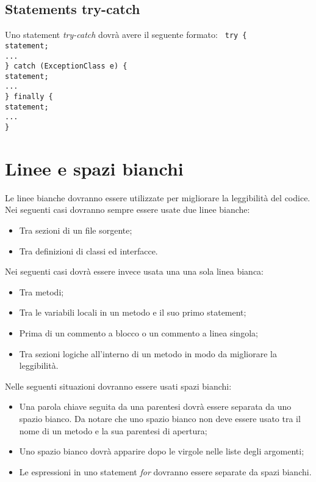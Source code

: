 \subsection{Statements try-catch}
Uno statement \textit{try-catch} dovr\`a avere il seguente formato:\newline
\texttt{
	 \newline
	try \{ \\
	\phantom{....}statement;\\
	\phantom{....}... \\
	\} catch (ExceptionClass e) \{ \\
	\phantom{....}statement;\\
	\phantom{....}... \\
	\} finally \{ \\
	\phantom{....}statement;\\
	\phantom{....}... \\
	\}
}

\section{Linee e spazi bianchi}
Le linee bianche dovranno essere utilizzate per migliorare la leggibilit\`a del codice. Nei seguenti casi dovranno sempre essere usate due linee bianche:
\begin{itemize}
\item Tra sezioni di un file sorgente;
\item Tra definizioni di classi ed interfacce.
\end{itemize}
Nei seguenti casi dovr\`a essere invece usata una una sola linea bianca:
\begin{itemize}
\item Tra metodi;
\item Tra le variabili locali in un metodo e il suo primo statement;
\item Prima di un commento a blocco o un commento a linea singola;
\item Tra sezioni logiche all'interno di un metodo in modo da migliorare la leggibilit\`a.
\end{itemize}
Nelle seguenti situazioni dovranno essere usati spazi bianchi:
\begin{itemize}
\item Una parola chiave seguita da una parentesi dovr\`a essere separata da uno spazio bianco. Da notare che uno spazio bianco non deve essere usato tra il nome di un metodo e la sua parentesi di apertura;
\item Uno spazio bianco dovr\`a apparire dopo le virgole nelle liste degli argomenti;
\item Le espressioni in uno statement \textit{for} dovranno essere separate da spazi bianchi.
\end{itemize}

